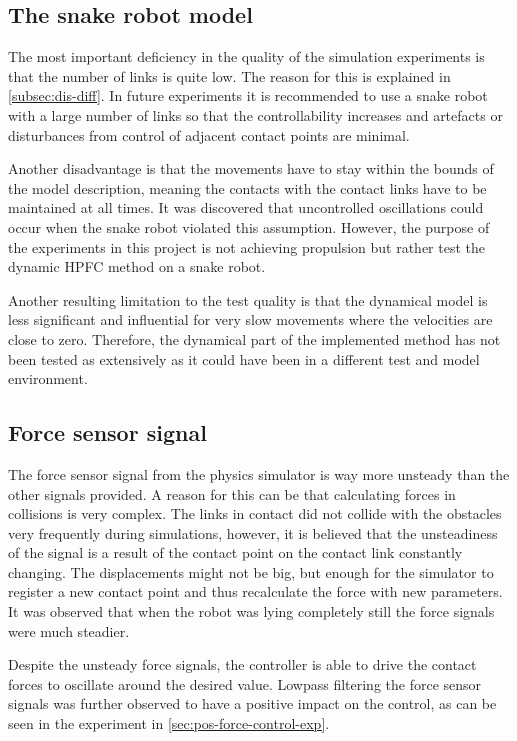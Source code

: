 \subsection{The snake robot model}

The most important deficiency in the quality of the simulation experiments is that the number of links is quite low. The reason for this is explained in \ref{subsec:dis-diff}. In future experiments it is recommended to use a snake robot with a large number of links so that the controllability increases and artefacts or disturbances from control of adjacent contact points are minimal.

Another disadvantage is that the movements have to stay within the bounds of the model description, meaning the contacts with the contact links have to be maintained at all times. It was discovered that uncontrolled oscillations could occur when the snake robot violated this assumption. However, the purpose of the experiments in this project is not achieving propulsion but rather test the dynamic HPFC method on a snake robot.

Another resulting limitation to the test quality is that the dynamical model is less significant and influential for very slow movements where the velocities are close to zero. Therefore, the dynamical part of the implemented method has not been tested as extensively as it could have been in a different test and model environment.

\subsection{Force sensor signal}

The force sensor signal from the physics simulator is way more unsteady than the other signals provided. A reason for this can be that calculating forces in collisions is very complex. The links in contact did not collide with the obstacles very frequently during simulations, however, it is believed that the unsteadiness of the signal is a result of the contact point on the contact link constantly changing. The displacements might not be big, but enough for the simulator to register a new contact point and thus recalculate the force with new parameters. It was observed that when the robot was lying completely still the force signals were much steadier.

Despite the unsteady force signals, the controller is able to drive the contact forces to oscillate around the desired value. Lowpass filtering the force sensor signals was further observed to have a positive impact on the control, as can be seen in the experiment in \ref{sec:pos-force-control-exp}.

